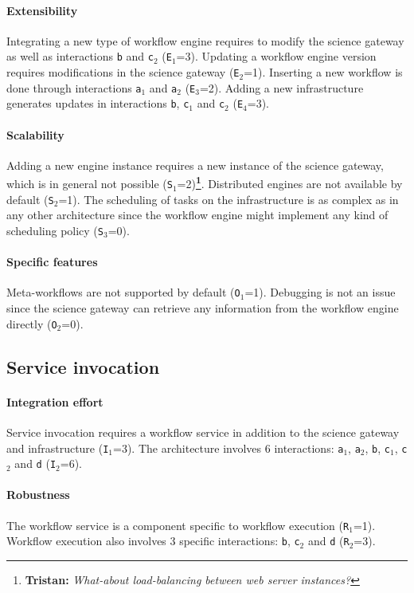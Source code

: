\documentclass[preprint,3p,twocolumn]{elsarticle}
\newcommand{\note}[2]{\textbf{\Large{\color{blue}\footnote{{\color{blue}\textbf{#1:} \textit{#2}\color{black}}}}}}
\begin{document}
\paragraph{Extensibility} Integrating a new type of workflow engine
requires to modify the science gateway as well as interactions
\texttt{b} and \texttt{c$_2$} (\texttt{E$_1$}=3). Updating a workflow
engine version requires modifications in the science gateway
(\texttt{E$_2$}=1).  Inserting a new workflow is done through
interactions \texttt{a$_1$} and \texttt{a$_2$} (\texttt{E$_3$}=2). Adding a new infrastructure generates updates in
interactions \texttt{b}, \texttt{c$_1$} and \texttt{c$_2$}
(\texttt{E$_4$}=3).

\paragraph{Scalability} Adding a new engine instance requires a new
instance of the science gateway, which is in general not possible
(\texttt{S$_1$}=2)\note{Tristan}{What-about load-balancing between web
  server instances?}. Distributed engines are not available by default
(\texttt{S$_2$}=1). The scheduling of tasks on the infrastructure is
as complex as in any other architecture since the workflow engine
might implement any kind of scheduling policy (\texttt{S$_3$}=0).

\paragraph{Specific features} Meta-workflows are not supported by default
(\texttt{O$_1$}=1).  Debugging is not an issue since the science
gateway can retrieve any information from the workflow engine directly
(\texttt{O$_2$}=0).

\subsection{Service invocation}

\paragraph{Integration effort} Service invocation requires a workflow service
in addition to the science gateway and infrastructure
(\texttt{I$_1$}=3). The architecture involves 6 interactions:
\texttt{a$_1$}, \texttt{a$_2$}, \texttt{b}, \texttt{c$_1$},
\texttt{c$_2$} and \texttt{d} (\texttt{I$_2$}=6).

\paragraph{Robustness} The workflow service is a component specific to
workflow execution (\texttt{R$_1$}=1). Workflow execution also
involves 3 specific interactions: \texttt{b},
\texttt{c$_2$} and \texttt{d} (\texttt{R$_2$}=3).
\end{document}
